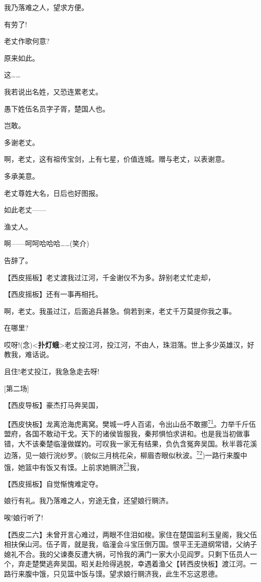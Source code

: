我乃落难之人，望求方便。

有劳了!

老丈作歌何意?

原来如此。

这\ldots{}\ldots{}

我若说出名姓，又恐连累老丈。

愚下姓伍名员字子胥，楚国人也。

岂敢。

多谢老丈。

啊，老丈，这有祖传宝剑，上有七星，价值连城。赠与老丈，以表谢意。

多承美意。

老丈尊姓大名，日后也好图报。

如此老丈------

渔丈人。

啊------呵呵哈哈哈\ldots{}\ldots{}(笑介)

告辞了。

【西皮摇板】老丈渡我过江河，千金谢仪不为多。辞别老丈忙走却，

【西皮摇板】还有一事再相托。

啊，老丈。我虽过江，后面追兵甚急。倘若到来，老丈千万莫提你我之事。

在哪里?

哎呀!(念)\textless{}\textbf{扑灯蛾}\textgreater{}老丈投江河，投江河，不由人，珠泪落。世上多少英雄汉，好教我，难话说。

且住!老丈投江，我急急走去呀!

{[}第二场{]}

【西皮导板】豪杰打马奔吴国，

【西皮快板】龙离沧海虎离窝。樊城一呼人百诺，令出山岳不敢挪\protect\hyperlink{fn71}{\textsuperscript{71}}。力举千斤伍盟府，各国不敢动干戈。天下的诸侯皆服我，秦邦惧怕求讲和。也是我当初做事错，大不该秦楚临潼做媒妁。可叹我一家无有结果，负仇含冤奔吴国。秋半蓉花溪边落，见一娘行浣纱罗。(貌似三月桃花朵，柳眉杏眼似秋波。\protect\hyperlink{fn72}{\textsuperscript{72}})一路行来腹中饿，她篮中有饭又有馍。上前求她赒济\protect\hyperlink{fn73}{\textsuperscript{73}}我，

【西皮摇板】自觉惭愧难定夺。

娘行有礼。我乃落难之人，穷途无食，还望娘行赒济。

唉!娘行听了!

【西皮二六】未曾开言心难过，两眼不住泪如梭。家住在楚国监利玉皇阁，我父伍相扶保山河。伍子胥，就是我，临潼会斗宝压倒万国。恨平王无道纲常错，父纳子媳礼不合。我的父谏奏反遭大祸，可怜我的满门一家大小见阎罗。只剩下伍员人一个，弃走楚樊逃奔吴国。昭关赴险得逃脱，幸遇着渔父【转西皮快板】渡江河。一路行来腹中饿，只见篮中饭与馍。望求娘行赒济我，此生不忘这恩德。

